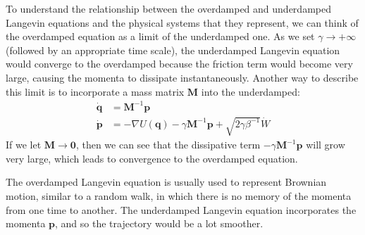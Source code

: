     To understand the relationship between the overdamped and underdamped Langevin equations and the physical systems that they represent, we can think of the overdamped equation as a limit of the underdamped one. As we set $\gamma \rightarrow +\infty$ (followed by an appropriate time scale), the underdamped Langevin equation would converge to the overdamped because the friction term would become very large, causing the momenta to dissipate instantaneously. Another way to describe this limit is to incorporate a mass matrix $\mathbf{M}$ into the underdamped: 
    \begin{align*}
      \mathbf{\dot{q}} & = \mathbf{M}^{-1} \mathbf{p} \\
      \mathbf{\dot{p}} & = - \nabla U(\mathbf{q}) - \gamma \mathbf{M}^{-1} \mathbf{p} + \sqrt{2\gamma \beta^{-1}} \dot{W}
    \end{align*}
    If we let $\mathbf{M} \rightarrow \mathbf{0}$, then we can see that the dissipative term $- \gamma \mathbf{M}^{-1}  \mathbf{p}$ will grow very large, which leads to convergence to the overdamped equation. 

    The overdamped Langevin equation is usually used to represent Brownian motion, similar to a random walk, in which there is no memory of the momenta from one time to another. The underdamped Langevin equation incorporates the momenta $\mathbf{p}$, and so the trajectory would be a lot smoother. 

